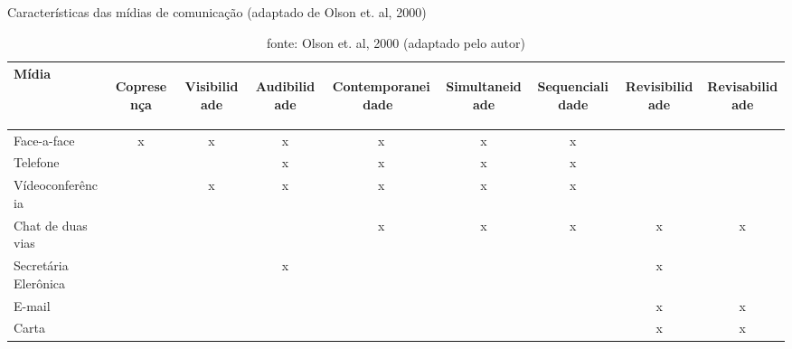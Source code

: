 \begin{table}[h!]
\centering
\caption{Características das mídias de comunicação (adaptado de Olson et. al, 2000)}
\label{my-label}
\begin{tabular}{l|c|c|c|c|c|c|c|c}
\hline
Mídia                & \begin{turn}{90}Copresença\end{turn} &\begin{turn}{90} Visibilidade\end{turn} & \begin{turn}{90}Audibilidade\end{turn} & \begin{turn}{90}Contemporaneidade \, \end{turn} & \begin{turn}{90}Simultaneidade\end{turn} & \begin{turn}{90}Sequencialidade\end{turn} &\begin{turn}{90}Revisibilidade\end{turn} & \begin{turn}{90}Revisabilidade\end{turn} \\ \hline
Face-a-face          &   x     &      x        &    x          &          x        &        x        &         x    &                &                \\ \hline
Telefone             &           &       &     x         &           x        &         x       &         x        &                &                \\ \hline
Vídeoconferência     &        &       x   &          x    &       x            &         x       &       x          &                &                \\ \hline
Chat de duas vias    &                                 &                                   &              &           x        &          x      &        x         &        x        &          x      \\ \hline
Secretária Elerônica &                                 &                                   &     x         &                   &                &                 &        x        &                \\ \hline
E-mail               &                                 &                                   &              &                   &                &                 &      x          &     x           \\ \hline
Carta                &                                 &                                   &              &                   &                &                 &       x         &       x         \\ \hline
\end{tabular}
\caption*{fonte: Olson et. al, 2000 (adaptado pelo autor)}
\end{table}

